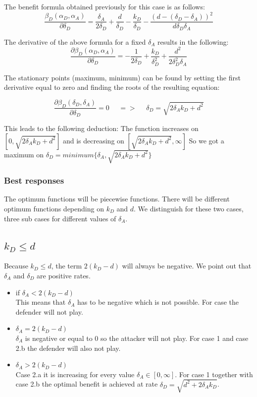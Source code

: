The benefit formula obtained previously for this case is as follows:
\begin{equation*}
\dfrac{\beta_{D}(\alpha_{D},\alpha_{A})}{\partial \delta_{D}} = \dfrac{\delta_{A}}{2\delta_{D}} + \dfrac{d}{\delta_{D}} - \dfrac{k_{D}}{\delta_{D}} - \dfrac{(d-(\delta_{D} - \delta_{A}))^{2}}{d\delta_{D}\delta_{A}}
\end{equation*}

The derivative of the above formula for a fixed $\delta_{A}$ results in the following:
\begin{equation*}
\frac{\partial \beta_{D}(\alpha_{D},\alpha_{A})}{\partial \delta_{D}} =  - \dfrac{1}{2\delta_{D}} + \dfrac{k_{D}}{\delta_{D}^{2}} + \dfrac{d^{2}}{2\delta_{D}^{2}\delta_{A}}
\end{equation*}


The stationary points (maximum, minimum) can be found by setting the first derivative equal to zero and finding the roots of the resulting equation:

\begin{equation*}
\frac{\partial \beta_{D}(\delta_{D},\delta_{A})}{\partial \delta_{D}} =0 ~~~~~~ =>~~~~~~ \delta_{D} = \sqrt{2\delta_{A}k_{D} + d^{2}}
\end{equation*}


This leads to the following deduction: The function increases on $[0, \sqrt{2\delta_{A}k_{D} + d^{2}}]$ and is decreasing on $[\sqrt{2\delta_{A}k_{D} + d^{2}}, \infty]$ So we got a maximum on $\delta_{D} = minimum \{ \delta_{A}, \sqrt{2\delta_{A}k_{D} + d^{2}} \} $ \\

\subsubsection{Best responses}
The optimum functions will be piecewise functions. There will be different optimum functions depending on $k_{D}$ and $d$. We distinguish for these two cases, three sub cases for different values of $\delta_{A}$. 

\subsection*{$k_{D} \leq d$}
Because $k_{D} \leq d$, the term $2(k_{D} - d)$ will always be negative. We point out that $\delta_{A}$ and $\delta_{D}$ are positive rates. 
\begin{itemize}
\item if $\delta_{A} < 2(k_{D} - d)$ \\
This means that $\delta_{A}$ has to be negative which is not possible. For case the defender will not play.
\item $\delta_{A} = 2(k_{D} - d)$ \\
$\delta_{A}$ is negative or equal to 0 so the attacker will not play. For case 1 and case 2.b the defender will also not play.
\item $\delta_{A} > 2(k_{D} - d)$ \\
Case 2.a it is increasing for every value $\delta_{A} \in [0,\infty]$.  For case 1 together with case 2.b the optimal benefit is achieved at rate $\delta_{D} = \sqrt{d^{2} + 2\delta_{A}k_{D}}$.
\end{itemize}



